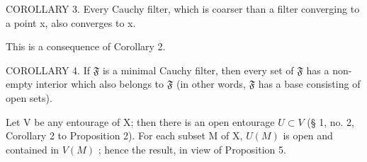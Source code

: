 COROLLARY 3. Every Cauchy filter, which is coarser than a filter converging to a point x, also converges to x.

This is a consequence of Corollary 2.

COROLLARY 4. If \(\mathfrak{F}\) is a minimal Cauchy filter, then every set of \(\mathfrak{F}\) has a non-empty interior which also belongs to \(\mathfrak{F}\) (in other words, \(\mathfrak{F}\) has a base consisting of open sets).

Let V be any entourage of X; then there is an open entourage \(U \subset V\) (§ 1, no. 2, Corollary 2 to Proposition 2). For each subset M of X, \(U(M)\) is open and contained in \(V(M)\) ; hence the result, in view of Proposition 5.

